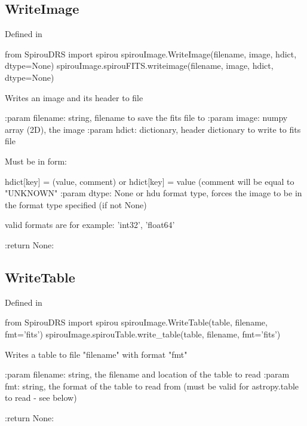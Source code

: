 \begin{minipage}{\textwidth}
\subsection{WriteImage}

Defined in \spirouImage{}

\begin{pythonbox}
from SpirouDRS import spirou
spirouImage.WriteImage(filename, image, hdict, dtype=None)
spirouImage.spirouFITS.writeimage(filename, image, hdict, dtype=None)
\end{pythonbox}

\begin{pythondocstring}
Writes an image and its header to file

:param filename: string, filename to save the fits file to
:param image: numpy array (2D), the image
:param hdict: dictionary, header dictionary to write to fits file

            Must be in form:

                    hdict[key] = (value, comment)
            or
                    hdict[key] = value     (comment will be equal to
                                            "UNKNOWN"
:param dtype: None or hdu format type, forces the image to be in the
              format type specified (if not None)

              valid formats are for example: 'int32', 'float64'

:return None:
\end{pythondocstring}
\end{minipage}


\begin{minipage}{\textwidth}
\subsection{WriteTable}

Defined in \spirouImage{}

\begin{pythonbox}
from SpirouDRS import spirou
spirouImage.WriteTable(table, filename, fmt='fits')
spirouImage.spirouTable.write_table(table, filename, fmt='fits')
\end{pythonbox}

\begin{pythondocstring}
Writes a table to file "filename" with format "fmt"

:param filename: string, the filename and location of the table to read
:param fmt: string, the format of the table to read from (must be valid
            for astropy.table to read - see below)

:return None:
\end{pythondocstring}
\end{minipage}


